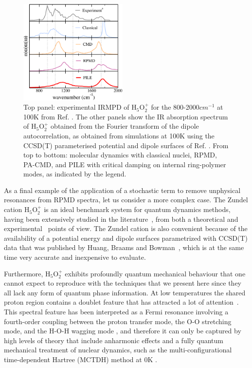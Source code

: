 \documentclass[aps,prb,superscriptaddress,amsmath,amssymb,showpacs,twocolumn]{revtex4}
\begin{document}
\begin{figure}[htbp]
\centering\includegraphics[width=0.48\textwidth]{figures/zundel_lowfreq_100K.pdf}
\caption{Top panel: experimental IRMPD of H$_5$O$_2^+$ for the 800-2000$cm^{-1}$ at 100K from Ref. \cite{AsmisScience2003}.
The other panels show the IR absorption spectrum of H$_5$O$_2^+$ obtained from the Fourier transform of 
the dipole autocorrelation, as obtained from simulations at 100K using the CCSD(T) parameterised potential 
and dipole surfaces of Ref. \cite{HuangBraamsBowman2005}. From top to bottom:
 molecular dynamics with classical nuclei, RPMD, PA-CMD, and PILE with critical damping on internal ring-polymer modes,
as indicated by the legend.}
\label{fig:zundel-lowf}
\end{figure}

As a final example of the application of a stochastic term to remove unphysical resonances 
from RPMD spectra, let us consider a more complex case. The Zundel cation H$_5$O$_2^+$ 
is an ideal benchmark system for quantum dynamics methods, having been 
extensively studied in the literature~\cite{Schatteburg2008}, from both a theoretical
\cite{AgostiniCiccotti2011, ParkKim2007, VenerSauer2001, SauerDoebler2005, ChengKrause1997, VendrellMeyer2007, 
BaerMarxMathias2010, KaledinBowmanJordan2009, HuangBraamsBowman2005} 
and experimental~\cite{YehLee1989, GuascoJohnson2011, AsmisScience2003, HammerBowmanCarter2005, FridgenMaitre2004}
points of view. The Zundel cation is also convenient because of the availability of a 
potential energy and dipole surfaces parametrized with CCSD(T) data that was 
published by Huang, Braams and Bowman~\cite{HuangBraamsBowman2005},
which is at the same time very accurate and inexpensive to evaluate. 

Furthermore, H$_5$O$_2^+$ exhibits profoundly quantum mechanical behaviour
that one cannot expect to reproduce with the techniques that we present here
since they all lack any form of quantum phase information. 
At low temperatures the shared proton region contains a doublet feature 
that has attracted a lot of attention~\cite{GuascoJohnson2011, HammerBowmanCarter2005}.
This spectral feature has been interpreted as a Fermi resonance
involving a fourth-order coupling between the proton transfer mode,
the O-O stretching mode, and the H-O-H wagging mode \cite{VendrellMeyer2007, Schatteburg2008},
and therefore it can only be captured by high levels of theory that include 
anharmonic effects and a fully quantum mechanical treatment
of nuclear dynamics, such as the multi-configurational time-dependent Hartree (MCTDH) method at
0K \cite{VendrellMeyer2007}.
\end{document}
